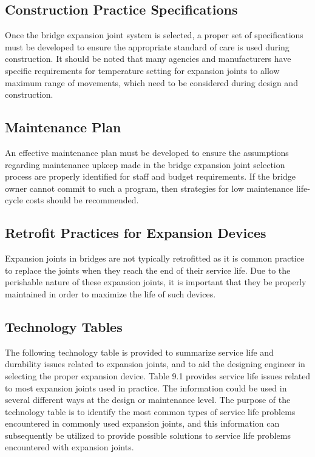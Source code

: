 \subsection{Construction Practice Specifications}
Once the bridge expansion joint system is selected, a proper set of specifications must be developed to ensure the
appropriate standard of care is used during construction. It should be noted that many agencies and manufacturers have specific requirements for temperature setting for expansion joints to allow maximum range of movements,
which need to be considered during design and construction.


\subsection{Maintenance Plan}
An effective maintenance plan must be developed to ensure the assumptions regarding maintenance upkeep made
in the bridge expansion joint selection process are properly identified for staff and budget requirements. If the bridge
owner cannot commit to such a program, then strategies for low maintenance life-cycle costs should be
recommended.

\subsection{Retrofit Practices for Expansion Devices}
Expansion joints in bridges are not typically retrofitted as it is common practice to replace the joints when they
reach the end of their service life. Due to the perishable nature of these expansion joints, it is important that they be
properly maintained in order to maximize the life of such devices.

\subsection{Technology Tables}
The following technology table is provided to summarize service life and durability issues related to expansion
joints, and to aid the designing engineer in selecting the proper expansion device. Table 9.1 provides service life
issues related to most expansion joints used in practice. The information could be used in several different ways at
the design or maintenance level. The purpose of the technology table is to identify the most common types of service
life problems encountered in commonly used expansion joints, and this information can subsequently be utilized to
provide possible solutions to service life problems encountered with expansion joints.

